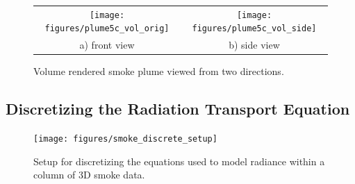 \begin{figure}[\figoptions]
\begin{center}
\begin{tabular}{cc}
\texttt{[image: figures/plume5c\_vol\_orig]}&
\texttt{[image: figures/plume5c\_vol\_side]}\\
a) front view&b) side view\\
\end{tabular}
\end{center}
\caption {Volume rendered smoke plume viewed from two directions.}
\label{fig:volplume_example}
\end{figure}

\subsection{Discretizing the Radiation Transport Equation}
\newcommand{\htau}[1]{\hat{\tau}_{#1}}
\newcommand{\sigai}[1]{\sigma_{a,#1}}
\newcommand{\Lei}[1]{L_{e,#1}}

\begin{figure}[\figoptions]
\begin{center}
\texttt{[image: figures/smoke\_discrete\_setup]}
\end{center}
\caption {Setup for discretizing the equations used to model
radiance within a column of 3D smoke data.}
\label{figsmokediscretesetup}
\end{figure}

